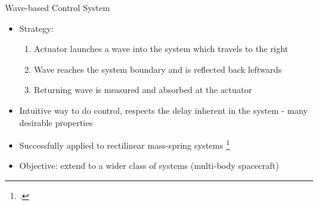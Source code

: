 \documentclass{beamer}
\begin{document}
\begin{frame}{Wave-based Control System}

\begin{itemize}
\item Strategy:
	\begin{enumerate} %
	\item Actuator launches a wave into the system which travels to the right 
	\item Wave reaches the system boundary and is reflected back leftwards
	\item Returning wave is measured and absorbed at the actuator
	\end{enumerate}
\item Intuitive way to do control, respects the delay inherent in the system - many desirable properties
\item Successfully applied to rectilinear mass-spring systems \footcite{OConnor1998}
\item Objective: extend to a wider class of systems (multi-body spacecraft)
\end{itemize}
\end{frame}
\end{document}
